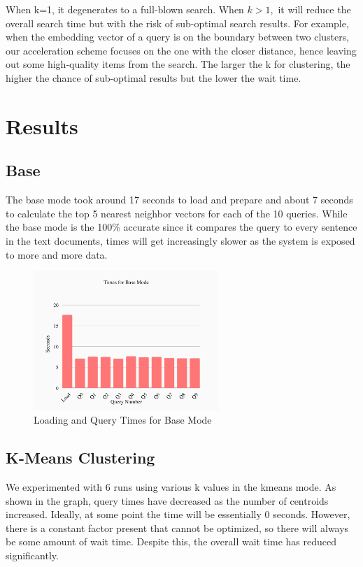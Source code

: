 \documentclass[11pt, a4paper, twocolumn]{article}
\begin{document}
When k=1, it degenerates to a full-blown search. When $k > 1,$ it will reduce the overall search time but with the risk of sub-optimal search results. For example, when the embedding vector of a query is on the boundary between two clusters, our acceleration scheme focuses on the one with the closer distance, hence leaving out some high-quality items from the search. The larger the k for clustering, the higher the chance of sub-optimal results but the lower the wait time.

\section{\Large{Results}}

\subsection{Base}
The base mode took around 17 seconds to load and prepare and about 7 seconds to calculate the top 5 nearest neighbor vectors for each of the 10 queries. While the base mode is the 100\% accurate since it compares the query to every sentence in the text documents, times will get increasingly slower as the system is exposed to more and more data.

\begin{figure}[htp]
    \centering
    \includegraphics[width=7cm]{base.png}
    \caption{Loading and Query Times for Base Mode}
    \label{fig:base}
\end{figure}
\subsection{{K}-Means Clustering}
We experimented with 6 runs using various k values in the kmeans mode. As shown in the graph, query times have decreased as the number of centroids increased. Ideally, at some point the time will be essentially 0 seconds. However, there is a constant factor present that cannot be optimized, so there will always be some amount of wait time. Despite this, the overall wait time has reduced significantly.
\end{document}
